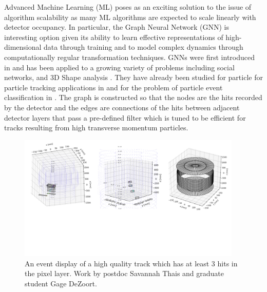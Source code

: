 \documentclass[preprint,12pt]{elsarticle}
\begin{document}
Advanced Machine Learning (ML) poses as an exciting solution to the issue of 
algorithm scalability as many ML algorithms are expected to scale linearly %
with detector occupancy.
In particular, the Graph Neural Network (GNN) is interesting option
given its ability to learn effective representations of high-dimensional data 
through training and to model complex dynamics through computationally regular 
transformation techniques.
GNNs were first introduced in \cite{4700287}
and has been applied to a growing variety of problems including social networks,
and 3D Shape analysis \cite{zhou2018graph}. They have already been studied for particle for particle tracking
applications in \cite{farrell2018novel} and for the problem
of particle event classification in \cite{martinez2018pileup,qu2019particlenet}.
The graph is constructed so that the nodes are the hits recorded by the detector and the 
edges are connections of the hits between adjacent detector layers that pass a pre-defined
filter which is tuned to be efficient for tracks resulting from high transverse momentum
particles. 

\begin{figure}[htbp]
\centering
     \includegraphics[trim=0 400 0 0,clip,width=0.95\textwidth]{Good_Track_event_display.jpeg}
     \caption{An event display of a high quality track which has at least 3 hits in the pixel layer. Work by postdoc Savannah Thais and graduate student Gage DeZoort.}
     \label{fig:goodtracks}
\end{figure}
\end{document}

